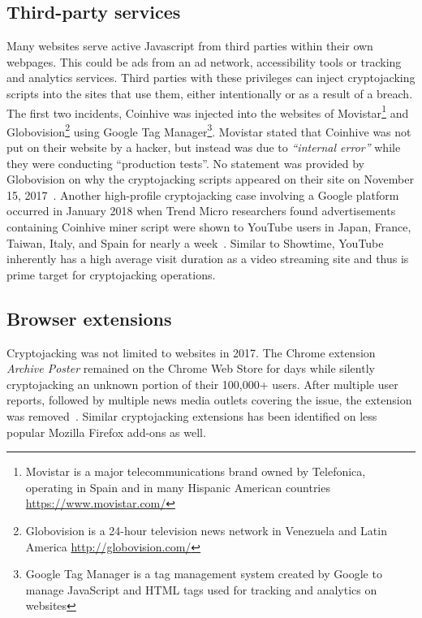 \subsection{Third-party services} 

Many websites serve active Javascript from third parties within their own webpages. This could be ads from an ad network, accessibility tools or tracking and analytics services. Third parties with these privileges can inject cryptojacking scripts into the sites that use them, either intentionally or as a result of a breach. The first two incidents, Coinhive was injected into the websites of Movistar\footnote{Movistar is a major telecommunications brand owned by Telefonica, operating in Spain and in many Hispanic American countries \url{https://www.movistar.com/}} and Globovision\footnote{Globovision is a 24-hour television news network in Venezuela and Latin America \url{http://globovision.com/}} using Google Tag Manager\footnote{Google Tag Manager is a tag management system created by Google to manage JavaScript and HTML tags used for tracking and analytics on websites}. Movistar stated that Coinhive was not put on their website by a hacker, but instead was due to \textit{``internal error''} while they were conducting ``production tests''. No statement was provided by Globovision on why the cryptojacking scripts appeared on their site on November 15, 2017~\cite{googletagcoinhive}. Another high-profile cryptojacking case involving a Google platform occurred in January 2018 when Trend Micro researchers found advertisements containing Coinhive miner script were shown to YouTube users in Japan, France, Taiwan, Italy, and Spain for nearly a week~\cite{trendmicrocoinhive}. Similar to Showtime, YouTube inherently has a high average visit duration as a video streaming site and thus is prime target for cryptojacking operations.


\subsection{Browser extensions} 

Cryptojacking was not limited to websites in 2017. The Chrome extension \textit{Archive Poster} remained on the Chrome Web Store for days while silently cryptojacking an unknown portion of their 100,000+ users. After multiple user reports, followed by multiple news media outlets covering the issue, the extension was removed~\cite{chromeextentioncoinhive}. Similar cryptojacking extensions has been identified on less popular Mozilla Firefox add-ons as well. 


